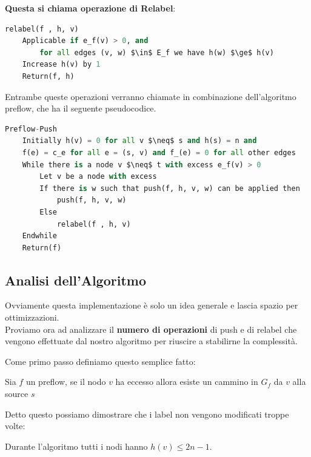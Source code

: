 \textbf{Questa si chiama operazione di Relabel}:
\begin{lstlisting}[language=Python, mathescape=true]
relabel(f , h, v)
    Applicable if e_f(v) > 0, and
        for all edges (v, w) $\in$ E_f we have h(w) $\ge$ h(v)
    Increase h(v) by 1
    Return(f, h)
\end{lstlisting}

Entrambe queste operazioni verranno chiamate in combinazione dell'algoritmo
preflow, che ha il seguente pseudocodice.

\begin{lstlisting}[language=Python, mathescape=true]
Preflow-Push
    Initially h(v) = 0 for all v $\neq$ s and h(s) = n and
    f(e) = c_e for all e = (s, v) and f_(e) = 0 for all other edges
    While there is a node v $\neq$ t with excess e_f(v) > 0
        Let v be a node with excess
        If there is w such that push(f, h, v, w) can be applied then
            push(f, h, v, w)
        Else
            relabel(f , h, v)
    Endwhile
    Return(f)
\end{lstlisting}

\subsection{Analisi dell'Algoritmo}
Ovviamente questa implementazione è solo un idea generale e lascia spazio per
ottimizzazioni.\\

Proviamo ora ad analizzare il \textbf{numero di operazioni} di push e di relabel
che vengono effettuate dal nostro algoritmo per riuscire a stabilirne la
complessità.

Come primo passo definiamo questo semplice fatto:
\begin{myblockquote}
	\begin{minipage}{\textwidth}
		\begin{definition}
			Sia $f$ un preflow, se il nodo $v$ ha eccesso allora esiste un cammino in
			$G_f$ da $v$ alla source $s$
		\end{definition}
	\end{minipage}
\end{myblockquote}

Detto questo possiamo dimostrare che i label non vengono modificati troppe
volte:

\begin{myblockquote}
	Durante l'algoritmo tutti i nodi hanno $h(v) \le 2n-1$.
\end{myblockquote}

